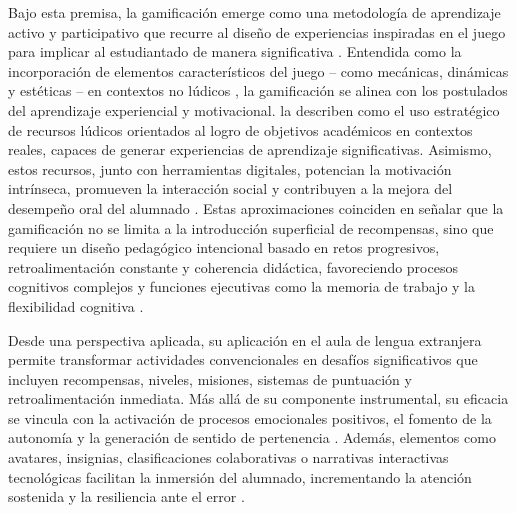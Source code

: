 \documentclass[spanish]{textolivre}
\begin{document}
Bajo esta premisa, la gamificación emerge como una metodología de aprendizaje activo y participativo que recurre al diseño de experiencias inspiradas en el juego para implicar al estudiantado de manera significativa \cite{contreras2016}. Entendida como la incorporación de elementos característicos del juego – como mecánicas, dinámicas y estéticas – en contextos no lúdicos \cite{zambrano2020}, la gamificación se alinea con los postulados del aprendizaje experiencial y motivacional. \textcite{parra2018} la describen como el uso estratégico de recursos lúdicos orientados al logro de objetivos académicos en contextos reales, capaces de generar experiencias de aprendizaje significativas. Asimismo, estos recursos, junto con herramientas digitales, potencian la motivación intrínseca, promueven la interacción social y contribuyen a la mejora del desempeño oral del alumnado \cite{wong2021}. Estas aproximaciones coinciden en señalar que la gamificación no se limita a la introducción superficial de recompensas, sino que requiere un diseño pedagógico intencional basado en retos progresivos, retroalimentación constante y coherencia didáctica, favoreciendo procesos cognitivos complejos y funciones ejecutivas como la memoria de trabajo y la flexibilidad cognitiva \cite{bedoya2022}.

Desde una perspectiva aplicada, su aplicación en el aula de lengua extranjera permite transformar actividades convencionales en desafíos significativos que incluyen recompensas, niveles, misiones, sistemas de puntuación y retroalimentación inmediata. Más allá de su componente instrumental, su eficacia se vincula con la activación de procesos emocionales positivos, el fomento de la autonomía y la generación de sentido de pertenencia \cite{garciamoreno2019, cordero2020}. Además, elementos como avatares, insignias, clasificaciones colaborativas o narrativas interactivas tecnológicas facilitan la inmersión del alumnado, incrementando la atención sostenida y la resiliencia ante el error \cite{iqbal2023}.
\end{document}
